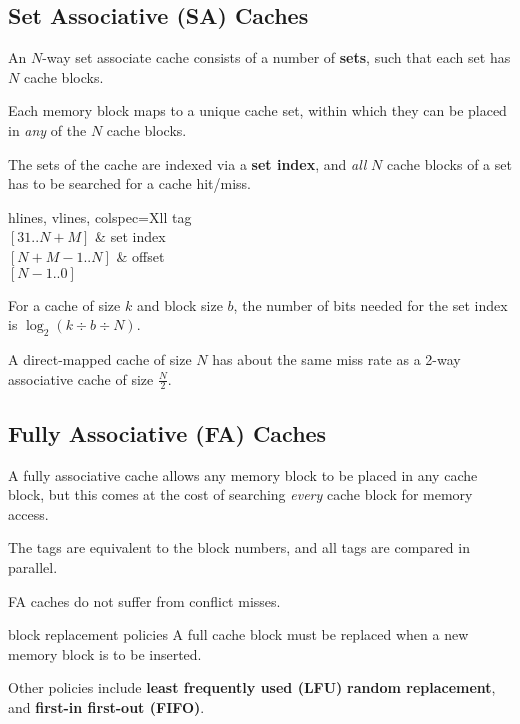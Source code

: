 \subsection{Set Associative (SA) Caches}
An $N$-way set associate cache consists of a number of \textbf{sets},
such that each set has $N$ cache blocks.

Each memory block maps to a unique cache set, within which they can be
placed in \textit{any} of the $N$ cache blocks.

The sets of the cache are indexed via a \textbf{set index}, and \textit{all} $N$ cache blocks
of a set has to be searched for a cache hit/miss.

\begin{tblr}{hlines, vlines, colspec={Xll}}
    { tag \\ $[31..N+M]$ } & { set index \\  $[N+M-1..N]$ } & { offset \\ $[N-1..0]$ } \\
\end{tblr}

For a cache of size $k$ and block size $b$, the number of bits needed for the set index is
$\log_2 (k \div b \div N)$.

A direct-mapped cache of size $N$ has about the same miss rate as a 2-way associative
cache of size $\frac{N}{2}$.


\subsection{Fully Associative (FA) Caches}
A fully associative cache allows any memory block to be placed in any cache block,
but this comes at the cost of searching \textit{every} cache block for memory access.

The tags are equivalent to the block numbers, and all tags are compared in parallel.

FA caches do not suffer from conflict misses.

\begin{defn}{block replacement policies}
    A full cache block must be replaced when a new memory block is to be inserted.

    \begin{itemize*}
    \end{itemize*}

    Other policies include \textbf{least frequently used (LFU)} \textbf{random replacement},
    and \textbf{first-in first-out (FIFO)}.
\end{defn}